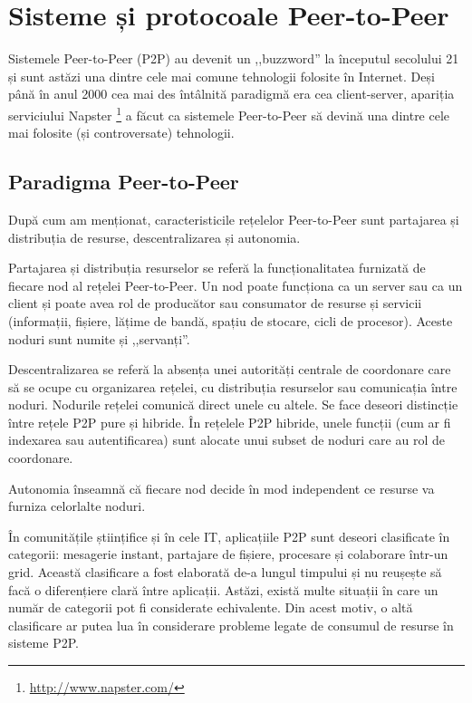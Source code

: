 
\chapter{Sisteme și protocoale Peer-to-Peer}
\label{chapter:p2p-systems}

Sistemele Peer-to-Peer (P2P) au devenit un ,,buzzword'' la începutul
secolului 21 și sunt astăzi una dintre cele mai comune tehnologii folosite
în Internet. Deși până în anul 2000 cea mai des întâlnită paradigmă
era cea client-server, apariția serviciului Napster
\footnote{\url{http://www.napster.com/}} a făcut ca sistemele Peer-to-Peer
să devină una dintre cele mai folosite (și controversate) tehnologii.

\section{Paradigma Peer-to-Peer}
\label{sec:p2p-systems:paragigm}

După cum am menționat, caracteristicile rețelelor Peer-to-Peer sunt 
partajarea și distribuția de resurse, descentralizarea și autonomia.

Partajarea și distribuția resurselor se referă la funcționalitatea
furnizată de fiecare nod al rețelei Peer-to-Peer. Un nod poate funcționa
ca un server sau ca un client și poate avea rol de producător sau
consumator de resurse și servicii (informații, fișiere, lățime de bandă,
spațiu de stocare, cicli de procesor). Aceste noduri sunt numite și
,,servanți''.

Descentralizarea se referă la absența unei autorități centrale de coordonare
care să se ocupe cu organizarea rețelei, cu distribuția resurselor sau
comunicația între noduri. Nodurile rețelei comunică direct unele cu altele.
Se face deseori distincție între rețele P2P pure și hibride. În rețelele P2P
hibride, unele funcții (cum ar fi indexarea sau autentificarea) sunt alocate
unui subset de noduri care au rol de coordonare.

Autonomia înseamnă că fiecare nod decide în mod independent ce resurse
va furniza celorlalte noduri.

În comunitățile științifice și în cele IT, aplicațiile P2P sunt deseori
clasificate în categorii: mesagerie instant, partajare de fișiere, procesare
și colaborare într-un grid.  Această clasificare a fost elaborată de-a lungul
timpului și nu reușește să facă o diferențiere clară între aplicații. Astăzi,
există multe situații în care un număr de categorii pot fi considerate
echivalente. Din acest motiv, o altă clasificare ar putea lua în considerare
probleme legate de consumul de resurse în sisteme P2P.

